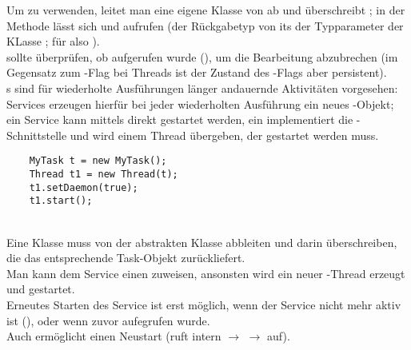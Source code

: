 Um  zu verwenden, leitet man eine eigene Klasse von  ab und überschreibt ; in der Methode lässt sich  und  aufrufen (der Rückgabetyp von  its der Typparameter der KLasse ; für  also ).\\
 sollte überprüfen, ob  aufgerufen wurde (), um die Bearbeitung abzubrechen (im Gegensatz zum -Flag bei Threads ist der Zustand des -Flags aber persistent).\\

\noindent
{}s sind für wiederholte Ausführungen länger andauernde Aktivitäten vorgesehen: Services erzeugen hierfür bei jeder wiederholten Ausführung ein neues -Objekt; ein Service kann mittels  direkt gestartet werden, ein  implementiert die -Schnittstelle und wird einem Thread übergeben, der gestartet werden muss.

\begin{verbatim}
    MyTask t = new MyTask();
    Thread t1 = new Thread(t);
    t1.setDaemon(true);
    t1.start();
\end{verbatim}\\

\noindent
Eine Klasse muss von der abstrakten Klasse  abbleiten und darin  überschreiben, die das entsprechende Task-Objekt zurückliefert.\\

\noindent
Man kann dem Service einen  zuweisen, ansonsten wird ein neuer -Thread erzeugt und gestartet.\\

\noindent
Erneutes Starten des Service ist erst möglich, wenn der Service nicht mehr aktiv ist (), oder wenn zuvor  aufegrufen wurde.\\
Auch  ermöglicht einen Neustart (ruft intern  $\rightarrow$  $\rightarrow$  auf).